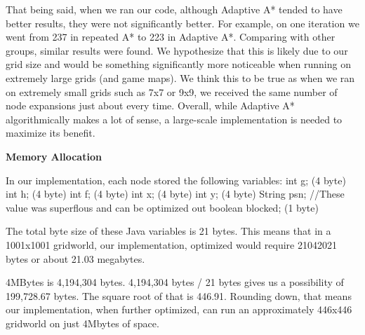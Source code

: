 \documentclass[12pt, letterpaper, twoside]{article}
\begin{document}
\begin{flushleft}
That being said, when we ran our code, although Adaptive A* tended to have better results, they were not significantly better. For example, on one iteration we went from 237 in repeated A* to 223 in Adaptive A*. Comparing with other groups, similar results were found. We hypothesize that this is likely due to our grid size and would be something significantly more noticeable when running on extremely large grids (and game maps). We think this to be true as when we ran on extremely small grids such as 7x7 or 9x9, we received the same number of node expansions just about every time. Overall, while Adaptive A* algorithmically makes a lot of sense, a large-scale implementation is needed to maximize its benefit.
\end{flushleft}
\begin{center}
    \textbf{Memory Allocation}
\end{center}
\begin{flushleft}
In our implementation, each node stored the following variables:
	\newline int g;	(4 byte)
	\newline int h;	(4 byte)
	\newline int f;	(4 byte)
	\newline int x;	(4 byte)
	\newline int y;	(4 byte)
	\newline String psn;	//These value was superflous and can be optimized out
	\newline boolean blocked;	(1 byte)
\end{flushleft}
\begin{flushleft}
The total byte size of these Java variables is 21 bytes.
This means that in a 1001x1001 gridworld, our implementation, optimized would require 21042021 bytes or about 21.03 megabytes. 
\end{flushleft}
\begin{flushleft}
4MBytes is 4,194,304 bytes. 4,194,304 bytes / 21 bytes gives us a possibility of 199,728.67 bytes. The square root of that is 446.91. Rounding down, that means our implementation, when further optimized, can run an approximately 446x446 gridworld on just 4Mbytes of space.
\end{flushleft}
\end{document}
